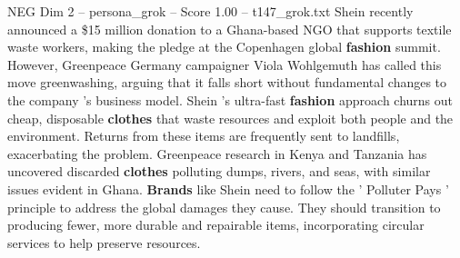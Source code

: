 \begin{textsample}{NEG Dim 2 – persona\_grok – Score 1.00 – t147\_grok.txt}  \label{ex:f2_neg_028}
Shein recently announced a \$15 million donation to a Ghana-based NGO that supports textile waste workers, making the pledge at the Copenhagen global \textbf{fashion} summit.
However, Greenpeace Germany campaigner Viola Wohlgemuth has called this move greenwashing, arguing that it falls short without fundamental changes to the company 's business model.
Shein 's ultra-fast \textbf{fashion} approach churns out cheap, disposable \textbf{clothes} that waste resources and exploit both people and the environment.
Returns from these items are frequently sent to landfills, exacerbating the problem.
Greenpeace research in Kenya and Tanzania has uncovered discarded \textbf{clothes} polluting dumps, rivers, and seas, with similar issues evident in Ghana. \textbf{Brands} like Shein need to follow the ' Polluter Pays ' principle to address the global damages they cause.
They should transition to producing fewer, more durable and repairable items, incorporating circular services to help preserve resources.

\end{textsample}
